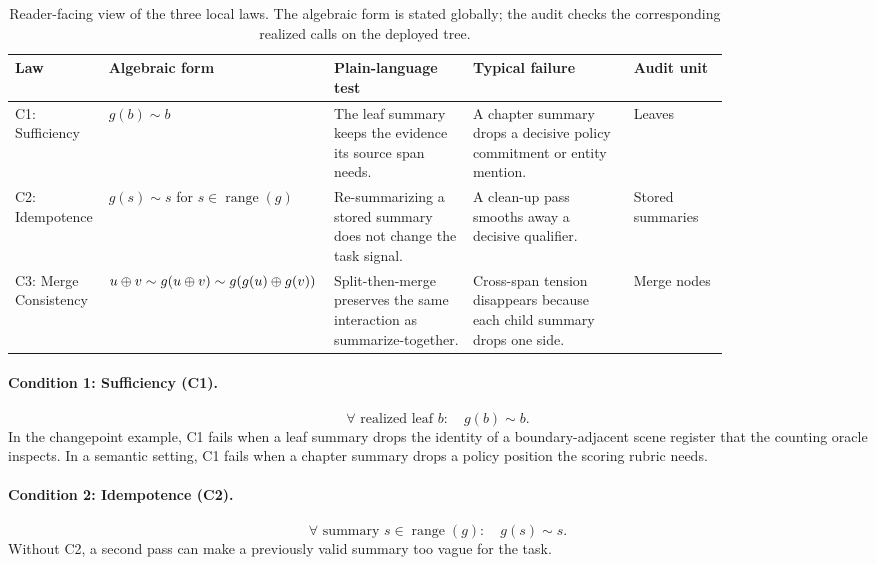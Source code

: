 \begin{table}[t]
\centering\footnotesize
\setlength{\tabcolsep}{3pt}
\begin{tabular}{p{0.11\linewidth}p{0.18\linewidth}p{0.19\linewidth}p{0.22\linewidth}p{0.13\linewidth}}
\toprule
Law & Algebraic form & Plain-language test & Typical failure & Audit unit \\
\midrule
C1: Sufficiency & $g(b)\sim b$ & The leaf summary keeps the evidence its source span needs. & A chapter summary drops a decisive policy commitment or entity mention. & Leaves \\
C2: Idempotence & $g(s)\sim s$ for $s \in \operatorname{range}(g)$ & Re-summarizing a stored summary does not change the task signal. & A clean-up pass smooths away a decisive qualifier. & Stored summaries \\
C3: Merge Consistency & $u \oplus v \sim g(u \oplus v) \sim g(g(u)\oplus g(v))$ & Split-then-merge preserves the same interaction as summarize-together. & Cross-span tension disappears because each child summary drops one side. & Merge nodes \\
\bottomrule
\end{tabular}
\caption{Reader-facing view of the three local laws. The algebraic form is stated globally; the audit checks the corresponding realized calls on the deployed tree.}
\label{tab:law-cards}
\end{table}

\paragraph{Condition 1: Sufficiency (C1).}
\begin{equation}\tag{C1}\label{eq:leaf_sufficiency}
\forall \text{ realized leaf } b:\quad g(b) \sim b.
\end{equation}
In the changepoint example, C1 fails when a leaf summary drops the identity of a boundary-adjacent scene register that the counting oracle inspects. In a semantic setting, C1 fails when a chapter summary drops a policy position the scoring rubric needs.

\paragraph{Condition 2: Idempotence (C2).}
\begin{equation}\tag{C2}\label{eq:leaf_idempotence}
\forall \text{ summary } s \in \operatorname{range}(g):\quad g(s) \sim s.
\end{equation}
Without C2, a second pass can make a previously valid summary too vague for the task.

